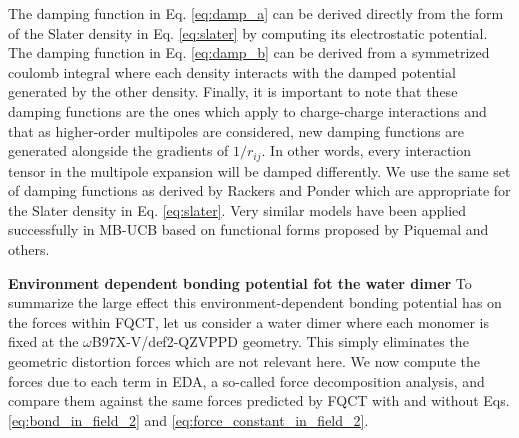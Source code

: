 \documentclass[12pt,letter]{article}
\begin{document}
The damping function in Eq. \ref{eq:damp_a} can be derived directly from the form
of the Slater density in Eq. \ref{eq:slater} by computing its electrostatic potential.
The damping function in Eq. \ref{eq:damp_b} can be derived from a symmetrized coulomb integral where each
density interacts with the damped potential generated by the other density.\cite{rackers2021polarizable}
Finally, it is important to note that these damping functions are the ones which apply
to charge-charge interactions and that as higher-order multipoles are considered, new damping
functions are generated alongside the gradients of $1/r_{ij}$. In other words, every interaction
tensor in the multipole expansion will be damped differently. We use the same set of damping functions
as derived by Rackers and Ponder which are appropriate for the Slater density in Eq. \ref{eq:slater}.\cite{rackers2021polarizable}
Very similar models have been applied successfully in MB-UCB\cite{das2019development}
based on functional forms proposed by Piquemal\cite{piquemal2003improved} and others\cite{wang2015general,rackers2017optimized}.

\textbf{Environment dependent bonding potential fot the water dimer}
To summarize the large effect this environment-dependent bonding potential has on the forces within FQCT, let us consider a water dimer where each monomer is fixed at the $\omega$B97X-V/def2-QZVPPD geometry. This simply eliminates the geometric distortion forces which are not relevant here. We now compute the forces due to each term in EDA, a so-called force decomposition analysis\cite{aldossary2023force}, and compare them against the same forces predicted by FQCT with and without Eqs. \ref{eq:bond_in_field_2} and \ref{eq:force_constant_in_field_2}.
\end{document}
